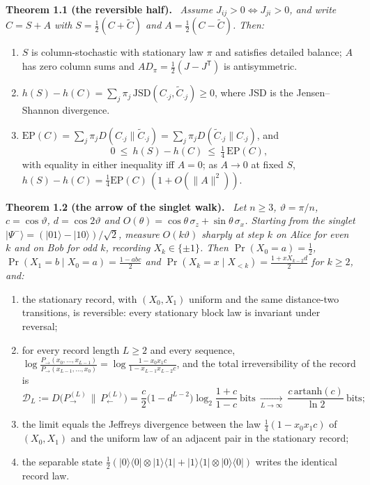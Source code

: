 \documentclass[11pt]{article}
\theoremstyle{definition}\newtheorem{definition}[theorem]{Definition}
\theoremstyle{remark}\newtheorem{remark}[theorem]{Remark}
\newenvironment{mainresult}[1]{\par\medskip\noindent\textbf{#1}\ \itshape\ignorespaces}{\par\medskip}
\begin{document}
\begin{mainresult}{Theorem 1.1 (the reversible half).}
Assume $J_{ij}>0\iff J_{ji}>0$, and write $C=S+A$ with $S=\frac12(C+\tilde C)$ and $A=\frac12(C-\tilde C)$. Then:
\begin{enumerate}
\item $S$ is column-stochastic with stationary law $\pi$ and satisfies detailed balance; $A$ has zero column sums and $AD_\pi=\frac12(J-J^{\mathsf T})$ is antisymmetric.
\item $h(S)-h(C)=\sum_j\pi_j\,\mathrm{JSD}(C_{\cdot j},\tilde C_{\cdot j})\ge0$, where JSD is the Jensen--Shannon divergence.
\item $\mathrm{EP}(C)=\sum_j\pi_jD(C_{\cdot j}\|\tilde C_{\cdot j})=\sum_j\pi_jD(\tilde C_{\cdot j}\|C_{\cdot j})$, and
\[
0\ \le\ h(S)-h(C)\ \le\ \tfrac14\,\mathrm{EP}(C),
\]
with equality in either inequality iff $A=0$; as $A\to0$ at fixed $S$, $h(S)-h(C)=\frac14\mathrm{EP}(C)\,(1+O(\|A\|^2))$.
\end{enumerate}
\end{mainresult}

\begin{mainresult}{Theorem 1.2 (the arrow of the singlet walk).}
Let $n\ge3$, $\vartheta=\pi/n$, $c=\cos\vartheta$, $d=\cos2\vartheta$ and $O(\theta)=\cos\theta\,\sigma_z+\sin\theta\,\sigma_x$. Starting from the singlet $|\Psi^-\rangle=(|01\rangle-|10\rangle)/\sqrt2$, measure $O(k\vartheta)$ sharply at step $k$ on Alice for even $k$ and on Bob for odd $k$, recording $X_k\in\{\pm1\}$. Then $\Pr(X_0=a)=\frac12$, $\Pr(X_1=b\mid X_0=a)=\frac{1-abc}2$ and $\Pr(X_k=x\mid X_{<k})=\frac{1+xX_{k-2}d}2$ for $k\ge2$, and:
\begin{enumerate}[label=(\alph*)]
\item the stationary record, with $(X_0,X_1)$ uniform and the same distance-two transitions, is reversible: every stationary block law is invariant under reversal;
\item for every record length $L\ge2$ and every sequence, $\log\frac{P_\to(x_0,\dots,x_{L-1})}{P_\to(x_{L-1},\dots,x_0)}=\log\frac{1-x_0x_1c}{1-x_{L-1}x_{L-2}c}$, and the total irreversibility of the record is
\[
\mathcal D_L:=D\bigl(P_\to^{(L)}\,\|\,P_\leftarrow^{(L)}\bigr)=\frac c2\bigl(1-d^{L-2}\bigr)\log_2\frac{1+c}{1-c}\ \text{bits}\ \xrightarrow[L\to\infty]{}\ \frac{c\,\mathrm{artanh}(c)}{\ln2}\ \text{bits};
\]
\item the limit equals the Jeffreys divergence between the law $\frac14(1-x_0x_1c)$ of $(X_0,X_1)$ and the uniform law of an adjacent pair in the stationary record;
\item the separable state $\frac12(|0\rangle\langle0|\otimes|1\rangle\langle1|+|1\rangle\langle1|\otimes|0\rangle\langle0|)$ writes the identical record law.
\end{enumerate}
\end{mainresult}
\end{document}
